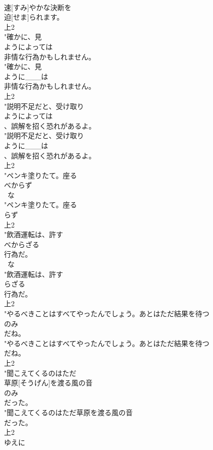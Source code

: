 \documentclass[8pt]{extreport}
\begin{document}
\begin{CJK}{UTF8}{min}
\\	速[すみ]やかな決断を
\\	迫[せま]られます。
\\	上2
\\	"確かに、見
\\	ようによっては
\\	非情な行為かもしれません。
\\	"確かに、見
\\	ように___は
\\	非情な行為かもしれません。
\\	上2
\\	"説明不足だと、受け取り
\\	ようによっては
\\	、誤解を招く恐れがあるよ。
\\	"説明不足だと、受け取り
\\	ように___は
\\	、誤解を招く恐れがあるよ。
\\	上2
\\	"ペンキ塗りたて。座る
\\	べからず
\\	~な 
\\	"ペンキ塗りたて。座る
\\	らず
\\	上2
\\	"飲酒運転は、許す
\\	べからざる
\\	行為だ。
\\	~な 
\\	"飲酒運転は、許す
\\	らざる
\\	行為だ。
\\	上2
\\	"やるべきことはすべてやったんでしょう。あとはただ結果を待つ
\\	のみ
\\	だね。
\\	"やるべきことはすべてやったんでしょう。あとはただ結果を待つ
\\	だね。
\\	上2
\\	"聞こえてくるのはただ
\\	草原[そうげん]を渡る風の音
\\	のみ
\\	だった。
\\	"聞こえてくるのはただ草原を渡る風の音
\\	だった。
\\	上2
\\	ゆえに

\end{CJK}
\end{document}
